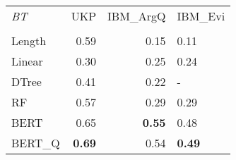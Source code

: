 \begin{tabular}{lrrl}
\toprule
\textit{BT} &   UKP &  IBM\_ArgQ & IBM\_Evi \\
	  &       &           &         \\
\midrule
Length &  0.59 &      0.15 &    0.11 \\
Linear &  0.30 &      0.25 &    0.24 \\
DTree  &  0.41 &      0.22 &       - \\
RF     &  0.57 &      0.29 &    0.29 \\
BERT   &  0.65 &      \textbf{0.55} &    0.48 \\
BERT\_Q &  \textbf{0.69} &      0.54 &    \textbf{0.49} \\
\bottomrule
\end{tabular}
